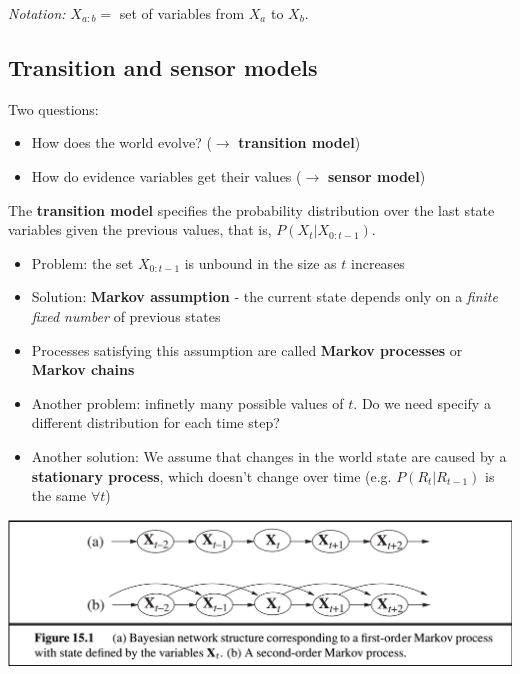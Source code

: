 \documentclass{scrartcl}
\begin{document}
\textit{Notation:} \(X_{a:b} = \) set of variables from \(X_a\) to \(X_b\).

\subsection{Transition and sensor models}
Two questions: 
\begin{itemize}
    \item
        How does the world evolve? (\(\rightarrow\) \textbf{transition model})
    \item
        How do evidence variables get their values (\(\rightarrow\) \textbf{sensor model})
\end{itemize}

\bigskip

The \textbf{transition model} specifies the probability distribution over the last state variables given the previous values, that is, \(P(X_t | X_{0:t-1})\).
\begin{itemize}
    \item
        Problem: the set \(X_{0:t-1}\) is unbound in the size as \(t\) increases
    \item
        Solution: \textbf{Markov assumption} - the current state depends only on a \textit{finite fixed number} of previous states  
    \item
        Processes satisfying this assumption are called \textbf{Markov processes} or \textbf{Markov chains} 
    \item
        Another problem: infinetly many possible values of \(t\). Do we need specify a different distribution for each time step?
    \item
        Another solution: We assume that changes in the world state are caused by a \textbf{stationary process}, which doesn't change over time (e.g. \(P(R_t | R_{t-1})\) is the same \(\forall t\))
\end{itemize}

\begin{center}
    \includegraphics[scale=0.4]{img/markpro.png}
\end{center}
\end{document}
